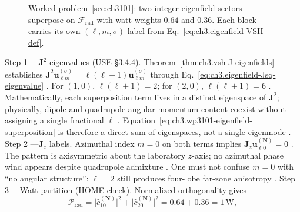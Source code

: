 \begin{figure}[t]
\centering
{}
\caption{Worked problem~\ref{sec:ch3101}: two integer eigenfield sectors superpose on \(\mathcal{F}_{\mathrm{rad}}\) with watt weights
\(0.64\) and \(0.36\). Each block carries its own \((\ell,m,\sigma)\) label from Eq.~\eqref{eq:ch3.eigenfield-VSH-def}.}
\label{fig:ch3.3101-dipole-quadrupole}
\end{figure}
Step 1 ---\(\mathbf{J}^{2}\) eigenvalues (USE §3.4.4). Theorem~\ref{thm:ch3.vsh-J-eigenfields} establishes
\(\mathbf{J}^{2}\mathbf{u}_{\ell m}^{(\sigma)}=\ell(\ell+1)\mathbf{u}_{\ell m}^{(\sigma)}\) through
Eq.~\eqref{eq:ch3.eigenfield-Jsq-eigenvalue} \cite{jackson1999}. For \((1,0)\),
\(\ell(\ell+1)=2\); for \((2,0)\), \(\ell(\ell+1)=6\) \cite{jackson1999}. Mathematically, each superposition term
lives in a distinct eigenspace of \(\mathbf{J}^{2}\); physically, dipole and quadrupole angular momentum content coexist without
assigning a single fractional \(\ell\) \cite{harrington2001}. Equation~\eqref{eq:ch3.wp3101-eigenfield-superposition} is
therefore a direct sum of eigenspaces, not a single eigenmode \cite{stratton1941}.
Step 2 ---\(\mathbf{J}_{z}\) labels. Azimuthal index \(m=0\) on both terms implies \(\mathbf{J}_{z}\mathbf{u}_{\ell 0}^{(\mathbf{N})}=0\) \cite{jackson1999}.
The pattern is axisymmetric about the laboratory \(z\)-axis; no azimuthal phase wind appears despite quadrupole admixture
\cite{stratton1941}. One must not confuse \(m=0\) with ``no angular structure'': \(\ell=2\) still produces
four-lobe far-zone anisotropy \cite{jackson1999}.
Step 3 ---Watt partition (HOME check). Normalized orthogonality gives
\begin{equation}
\label{eq:ch3.wp3101-power-partition}
\mathcal{P}_{\mathrm{rad}}
=
\bigl|\widehat{c}_{10}^{(\mathbf{N})}\bigr|^{2}
+
\bigl|\widehat{c}_{20}^{(\mathbf{N})}\bigr|^{2}
=
0.64+0.36
=
1\,\mathrm{W},
\end{equation}
